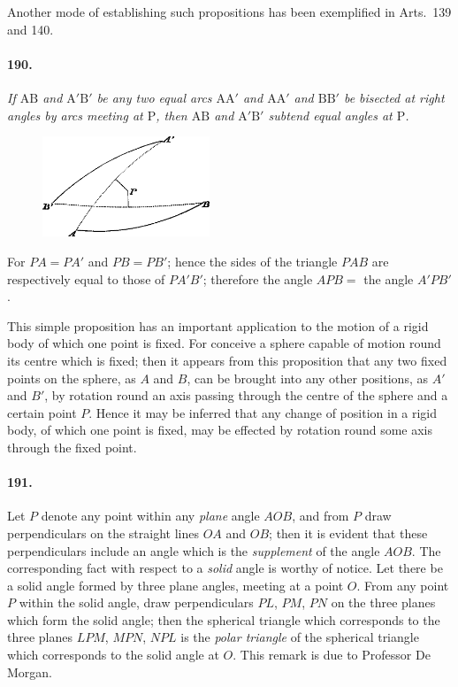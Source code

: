 \documentclass{book}[2004/02/16]
\begin{document}
\begin{mainmatter}
\begin{spacing}{1.3}
Another mode of establishing such propositions has been
exemplified in Arts.\ 139 and 140.

\paragraph{190.} \textit{If $\mathrm{AB}$ and $\mathrm{A'B'}$ be any two equal arcs
$\mathrm{AA'}$ and $\mathrm{AA'}$ and $\mathrm{BB'}$ be bisected at right angles by arcs meeting at $\mathrm{P}$,
then $\mathrm{AB}$ and $\mathrm{A'B'}$ subtend equal angles at $\mathrm{P}$.}
\begin{figure}[htp]
\centering
\includegraphics[width=5.0cm]{images/149fc}
\end{figure}

For $PA = PA'$ and $PB = PB'$; hence the sides of the triangle
$PAB$ are respectively equal to those of $PA'B'$; therefore the angle
$APB =$ the angle $A'PB'$.

This simple proposition has an important application to the
motion of a rigid body of which one point is fixed. For conceive
a sphere capable of motion round its centre which is fixed; then it
appears from this proposition that any two fixed points on the
sphere, as $A$ and $B$, can be brought into any other positions, as
$A'$ and $B'$, by rotation round an axis passing through the centre of
the sphere and a certain point $P$. Hence it may be inferred that
any change of position in a rigid body, of which one point is fixed,
may be effected by rotation round some axis through the fixed
point.
\nopagebreak\par
{}

\paragraph{191.} Let $P$ denote any point within any \textit{plane} angle $AOB$,
and from $P$ draw perpendiculars on the straight lines $OA$ and
$OB$; then it is evident that these perpendiculars include an angle
which is the \textit{supplement} of the angle $AOB$. The corresponding
fact with respect to a \textit{solid} angle is worthy of notice. Let there
be a solid angle formed by three plane angles, meeting at a point
$O$. From any point $P$ within the solid angle, draw perpendiculars
$PL$, $PM$, $PN$ on the three planes which form the solid angle;
then the spherical triangle which corresponds to the three planes
$LPM$, $MPN$, $NPL$ is the \textit{polar triangle} of the spherical triangle
which corresponds to the solid angle at $O$. This remark is due to
Professor De Morgan.


\end{spacing}
\end{mainmatter}
\end{document}
